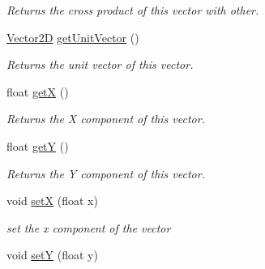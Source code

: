 \begin{DoxyCompactItemize}
\begin{DoxyCompactList}\small\item\em Returns the cross product of this vector with other. \end{DoxyCompactList}\item 
\hypertarget{class_vector2_d_a9ec064ffe930ae93d0f420390be126e8}{\hyperlink{class_vector2_d}{Vector2\-D} \hyperlink{class_vector2_d_a9ec064ffe930ae93d0f420390be126e8}{get\-Unit\-Vector} ()}\label{class_vector2_d_a9ec064ffe930ae93d0f420390be126e8}

\begin{DoxyCompactList}\small\item\em Returns the unit vector of this vector. \end{DoxyCompactList}\item 
\hypertarget{class_vector2_d_a527601e47976bcfdac2520817bfee675}{float \hyperlink{class_vector2_d_a527601e47976bcfdac2520817bfee675}{get\-X} ()}\label{class_vector2_d_a527601e47976bcfdac2520817bfee675}

\begin{DoxyCompactList}\small\item\em Returns the X component of this vector. \end{DoxyCompactList}\item 
\hypertarget{class_vector2_d_a5b797fb62a3c21ced0cc8e27afd62f8b}{float \hyperlink{class_vector2_d_a5b797fb62a3c21ced0cc8e27afd62f8b}{get\-Y} ()}\label{class_vector2_d_a5b797fb62a3c21ced0cc8e27afd62f8b}

\begin{DoxyCompactList}\small\item\em Returns the Y component of this vector. \end{DoxyCompactList}\item 
\hypertarget{class_vector2_d_ac458bd997d2f0c6c7234cf1e8a7b73b8}{void \hyperlink{class_vector2_d_ac458bd997d2f0c6c7234cf1e8a7b73b8}{set\-X} (float x)}\label{class_vector2_d_ac458bd997d2f0c6c7234cf1e8a7b73b8}

\begin{DoxyCompactList}\small\item\em set the x component of the vector \end{DoxyCompactList}\item 
\hypertarget{class_vector2_d_a9b47adcbdf2c10f3ba893285b5c34709}{void \hyperlink{class_vector2_d_a9b47adcbdf2c10f3ba893285b5c34709}{set\-Y} (float y)}\label{class_vector2_d_a9b47adcbdf2c10f3ba893285b5c34709}


\end{DoxyCompactItemize}
